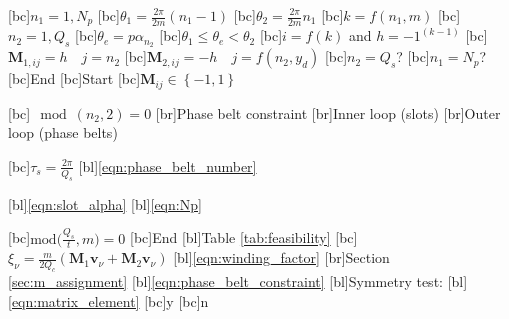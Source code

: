 \begin{psfrags}%
\psfragscanon

[bc]{$n_1 = 1,N_p$}
[bc]{$\theta_1=\frac{2\pi}{2m}(n_1-1)$}
[bc]{$\theta_2=\frac{2\pi}{2m}n_1$}
[bc]{$k=f(n_1,m)$}
[bc]{$n_2 = 1,Q_s$}
[bc]{$\theta_e = p\alpha_{n_2}$}
[bc]{$\theta_1 \leq \theta_e < \theta_2$}
[bc]{$i=f(k)$ and $h=-1^{(k-1)}$}
[bc]{$\mathbf{M}_{1,ij}=h \quad j=n_2$}
[bc]{$\mathbf{M}_{2,ij}=-h \quad j=f(n_2,y_d)$}
[bc]{$n_2=Q_s$?}
[bc]{$n_1=N_p$?}
[bc]{End}
[bc]{Start}
[bc]{$\mathbf{M}_{ij} \in \left\{-1,1\right\}$}

[bc]{$\mod(n_2,2)=0$}
[br]{Phase belt constraint}
[br]{Inner loop (slots)}
[br]{Outer loop (phase belts)}

[bc]{$\tau_s=\frac{2\pi}{Q_s}$}
[bl]{\eqref{eqn:phase_belt_number}}

[bl]{\eqref{eqn:slot_alpha}}
[bl]{\eqref{eqn:Np}}

[bc]{$\mbox{mod}\bigl(\frac{Q_s}{t},m\bigr)=0$}
[bc]{End}
[bl]{Table \ref{tab:feasibility}}
[bc]{$\xi_{\nu} = \frac{m}{2Q_c}(                              
                  \mathbf{M}_1\mathbf{v}_{\nu}+\mathbf{M}_2\mathbf{v}_{\nu})$}
[bl]{\eqref{eqn:winding_factor}}
[br]{Section \ref{sec:m_assignment}}
[bl]{\eqref{eqn:phase_belt_constraint}}
[bl]{Symmetry test:}
[bl]{\eqref{eqn:matrix_element}}
[bc]{y}
[bc]{n}


\end{psfrags}
